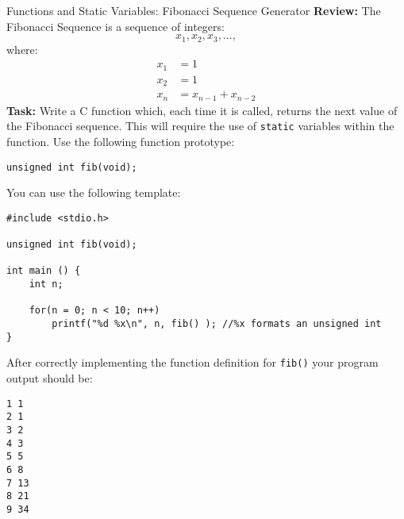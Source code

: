 \documentclass{lab}
\begin{document}
\pagebreak
\begin{task}{Functions and Static Variables: Fibonacci Sequence Generator}{}
\textbf{Review:} The Fibonacci Sequence is a sequence of integers:
\begin{equation*}
x_1, x_2, x_3, ..., 
\end{equation*}
where:
\begin{align*}
x_1 &= 1\\
x_2 &= 1\\
x_n &= x_{n-1} + x_{n-2}
\end{align*}
\textbf{Task:} Write a C function which, each time it is called, returns the next value of the Fibonacci sequence. This will require the use of \texttt{static} variables within the function. Use the following function prototype:
\begin{lstlisting}[style=CStyle]
unsigned int fib(void);
\end{lstlisting}

You can use the following template:
\begin{lstlisting}[style=CStyle]
#include <stdio.h>

unsigned int fib(void);

int main () {
	int n;
	
	for(n = 0; n < 10; n++)
		printf("%d %x\n", n, fib() ); //%x formats an unsigned int
} 
\end{lstlisting}

After correctly implementing the function definition for \texttt{fib()} your program output should be:
\begin{lstlisting}[style=pseudo]
1 1
2 1
3 2
4 3
5 5
6 8
7 13
8 21
9 34
\end{lstlisting}
\end{task}
\end{document}
